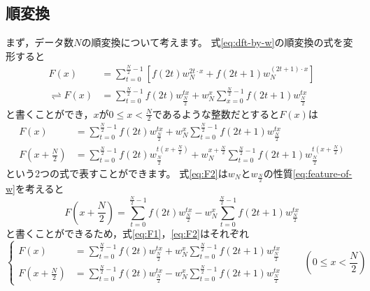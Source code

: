 \documentclass[uplatex, 11pt, a4j, dvipdfmx]{jsarticle}
\begin{document}
    \subsection{順変換}
    まず，データ数$N$の順変換について考えます。
    式\eqref{eq:dft-by-w}の順変換の式を変形すると
    \begin{align}
        F(x) &= \sum_{t=0}^{\frac{N}{2}-1} { \left[ f(2t) w^{2t \cdot x}_{N} + f(2t + 1) w^{(2t + 1) \cdot x}_{N} \right] } \\
        \rightleftharpoons
        F(x) &= \sum_{t=0}^{\frac{N}{2}-1} { f(2t) w^{tx}_{\frac{N}{2}} } +  w^{x}_{N} \sum_{x=0}^{\frac{N}{2}-1} { f(2t + 1) w^{tx}_{\frac{N}{2}} }
    \end{align}
    と書くことができ，$x$が$0 \le x < \frac{N}{2}$であるような整数だとすると$F(x)$は
    \begin{align}
            F(x)               &= \sum_{t=0}^{\frac{N}{2}-1} { f(2t) w^{tx}_{\frac{N}{2}} }
                                + w^{x}_{N} \sum_{t=0}^{\frac{N}{2}-1} { f(2t + 1) w^{tx}_{\frac{N}{2}} }
                                \label{eq:F1} \\
            F(x + \frac{N}{2}) &= \sum_{t=0}^{\frac{N}{2}-1} { f(2t) w^{t\left(x + \frac{N}{2}\right)}_{\frac{N}{2}} }
                                + w^{x + \frac{N}{2}}_{N} \sum_{t=0}^{\frac{N}{2}-1} { f(2t + 1) w^{t\left(x + \frac{N}{2}\right)}_{\frac{N}{2}} }
                                \label{eq:F2}
    \end{align}
    という2つの式で表すことができます。
    式\eqref{eq:F2}は$w_{N}$と$w_{\frac{N}{2}}$の性質\eqref{eq:feature-of-w}を考えると
    \begin{equation}
        F(x + \frac{N}{2}) = \sum_{t=0}^{\frac{N}{2}-1} { f(2t) w^{tx}_{\frac{N}{2}} } -  w^{x}_{N} \sum_{t=0}^{\frac{N}{2}-1} { f(2t + 1) w^{tx}_{\frac{N}{2}} }
    \end{equation}
    と書くことができるため，式\eqref{eq:F1}，\eqref{eq:F2}はそれぞれ
    \begin{equation}
        \left\{ \begin{aligned}
            F(x)               &= \sum_{t=0}^{\frac{N}{2}-1} { f(2t) w^{tx}_{\frac{N}{2}} } + w^{x}_{N} \sum_{t=0}^{\frac{N}{2}-1} { f(2t + 1) w^{tx}_{\frac{N}{2}} } \\
            F(x + \frac{N}{2}) &= \sum_{t=0}^{\frac{N}{2}-1} { f(2t) w^{tx}_{\frac{N}{2}} } -  w^{x}_{N} \sum_{t=0}^{\frac{N}{2}-1} { f(2t + 1) w^{tx}_{\frac{N}{2}} }
        \end{aligned} \right. \qquad (0 \le x < \frac{N}{2}) \label{eq:F_N'}
    \end{equation}
\end{document}
